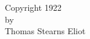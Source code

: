 \newpage
\phantom{Free space for short editorial comments.} \vglue -14pt
\vfill
\begin{center}
  Copyright 1922\\ by\\ Thomas Stearns Eliot
\end{center}
\vfill
\newpage

